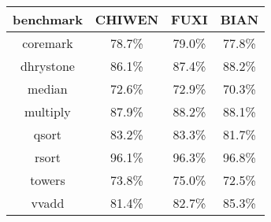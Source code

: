 \begin{table}[!htbp]
	\label{tab:accurate_result_ruo}
	\centering
	\footnotesize%
	\setlength{\tabcolsep}{4pt}%
	\renewcommand{\arraystretch}{1.2}%
	\begin{tabular}{cccc}
		\hline
		benchmark & CHIWEN & FUXI & BIAN \\%
		\hline
		coremark    & 78.7\% & 79.0\% & 77.8\% \\
		dhrystone   & 86.1\% & 87.4\% & 88.2\% \\
		median 		& 72.6\% & 72.9\% & 70.3\% \\
		multiply 	& 87.9\% & 88.2\% & 88.1\% \\
		qsort  		& 83.2\% & 83.3\% & 81.7\% \\
		rsort  		& 96.1\% & 96.3\% & 96.8\% \\
		towers 		& 73.8\% & 75.0\% & 72.5\% \\
		vvadd 		& 81.4\% & 82.7\% & 85.3\% \\
		\hline
	\end{tabular}
\end{table}

